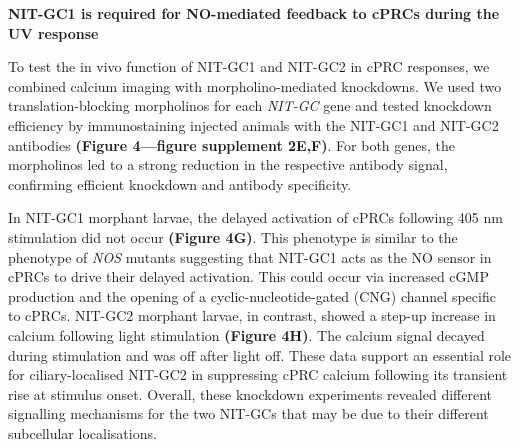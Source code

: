 \documentclass[
  10pt,
  onecolumn]{article}
\begin{document}
\textbf{NIT-GC1 is required for NO-mediated feedback to cPRCs during the
UV response}

To test the in vivo function of NIT-GC1 and NIT-GC2 in cPRC responses,
we combined calcium imaging with morpholino-mediated knockdowns. We used
two translation-blocking morpholinos for each \emph{NIT-GC} gene and
tested knockdown efficiency by immunostaining injected animals with the
NIT-GC1 and NIT-GC2 antibodies \textbf{(Figure 4---figure supplement
2E,F)}. For both genes, the morpholinos led to a strong reduction in the
respective antibody signal, confirming efficient knockdown and antibody
specificity.

In NIT-GC1 morphant larvae, the delayed activation of cPRCs following
405 nm stimulation did not occur \textbf{(Figure 4G)}. This phenotype is
similar to the phenotype of \emph{NOS} mutants suggesting that NIT-GC1
acts as the NO sensor in cPRCs to drive their delayed activation. This
could occur via increased cGMP production and the opening of a
cyclic-nucleotide-gated (CNG) channel specific to cPRCs. NIT-GC2
morphant larvae, in contrast, showed a step-up increase in calcium
following light stimulation \textbf{(Figure 4H)}. The calcium signal
decayed during stimulation and was off after light off. These data
support an essential role for ciliary-localised NIT-GC2 in suppressing
cPRC calcium following its transient rise at stimulus onset. Overall,
these knockdown experiments revealed different signalling mechanisms for
the two NIT-GCs that may be due to their different subcellular
localisations.
\end{document}
